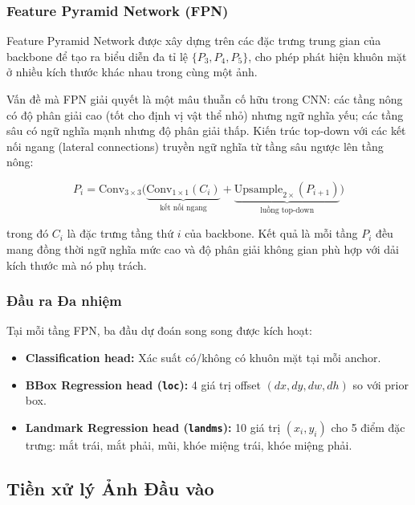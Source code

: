 \subsubsection{Feature Pyramid Network (FPN)}

Feature Pyramid Network \cite{Lin2017FPN} được xây dựng trên các đặc trưng trung gian của backbone để tạo ra biểu diễn đa tỉ lệ $\{P_3, P_4, P_5\}$, cho phép phát hiện khuôn mặt ở nhiều kích thước khác nhau trong cùng một ảnh.

Vấn đề mà FPN giải quyết là một mâu thuẫn cố hữu trong CNN: các tầng nông có độ phân giải cao (tốt cho định vị vật thể nhỏ) nhưng ngữ nghĩa yếu; các tầng sâu có ngữ nghĩa mạnh nhưng độ phân giải thấp. Kiến trúc top-down với các kết nối ngang (lateral connections) truyền ngữ nghĩa từ tầng sâu ngược lên tầng nông:

\begin{equation}
\label{eq:fpn}
P_i = \text{Conv}_{3\times3}\Big( \underbrace{\text{Conv}_{1\times1}(C_i)}_{\text{kết nối ngang}} + \underbrace{\text{Upsample}_{2\times}(P_{i+1})}_{\text{luồng top-down}} \Big)
\end{equation}

\noindent trong đó $C_i$ là đặc trưng tầng thứ $i$ của backbone. Kết quả là mỗi tầng $P_i$ đều mang đồng thời ngữ nghĩa mức cao và độ phân giải không gian phù hợp với dải kích thước mà nó phụ trách.

\subsubsection{Đầu ra Đa nhiệm}

Tại mỗi tầng FPN, ba đầu dự đoán song song được kích hoạt:
\begin{itemize}
    \item \textbf{Classification head:} Xác suất có/không có khuôn mặt tại mỗi anchor.
    \item \textbf{BBox Regression head (\texttt{loc}):} 4 giá trị offset $(dx, dy, dw, dh)$ so với prior box.
    \item \textbf{Landmark Regression head (\texttt{landms}):} 10 giá trị $(x_i, y_i)$ cho 5 điểm đặc trưng: mắt trái, mắt phải, mũi, khóe miệng trái, khóe miệng phải.
\end{itemize}

\subsection{Tiền xử lý Ảnh Đầu vào}
\label{subsec:retinaface_preprocess}

